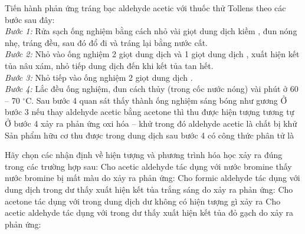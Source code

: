 \documentclass[12pt,a4paper]{article}
\begin{document}
\begin{ex}
Tiến hành phản ứng tráng bạc aldehyde acetic với thuốc thử Tollens theo các bước sau đây:\\
\textit{Bước 1:} Rửa sạch ống nghiệm bằng cách nhỏ vài giọt dung dịch kiềm , đun nóng nhẹ, tráng đều, sau đó đổ đi và tráng lại bằng nước cất.\\
\textit{Bước 2:} Nhỏ vào ống nghiệm 2 giọt dung dịch  và 1 giọt dung dịch , xuất hiện kết tủa nâu xám, nhỏ tiếp dung dịch  đến khi kết tủa tan hết.\\
\textit{Bước 3:} Nhỏ tiếp vào ống nghiệm 2 giọt dung dịch .\\
\textit{Bước 4:} Lắc đều ống nghiệm, đun cách thủy (trong cốc nước nóng) vài phút ở 60 -- 70 $^\circ$C.
\choiceTF
{\True Sau bước 4 quan sát thấy thành ống nghiệm sáng bóng như gương}
{Ở bước 3 nếu thay aldehyde acetic bằng acetone thì thu được hiện tượng tương tự}
{Ở bước 4 xảy ra phản ứng oxi hóa -- khử trong đó aldehyde acetic là chất bị khử}
{\True Sản phẩm hữu cơ thu được trong dung dịch sau bước 4 có công thức phân tử là }

\end{ex}

\begin{ex}
Hãy chọn các nhận định về hiện tượng và phương trình hóa học xảy ra đúng trong các trường hợp sau:
\choiceTF
{\True Cho acetic aldehyde tác dụng với nước bromine thấy nước bromine bị mất màu do xảy ra phản ứng: }
{\True Cho formic aldehyde tác dụng với dung dịch  trong  dư thấy xuất hiện kết tủa trắng sáng do xảy ra phản ứng: }
{Cho acetone tác dụng với  trong dung dịch  dư không có hiện tượng gì xảy ra}
{Cho acetic aldehyde tác dụng với  trong  dư thấy xuất hiện kết tủa đỏ gạch do xảy ra phản ứng: }

\end{ex}
\end{document}
